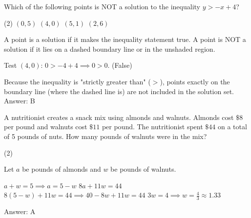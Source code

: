 \documentclass[11pt,paper=a4,answers]{exam}
\begin{document}
\begin{questions}
\question
\begin{center}
\end{center}
Which of the following points is NOT a solution to the inequality $y > -x + 4$?
\begin{tasks}(2)
\task $(0, 5)$
\task $(4, 0)$
\task $(5, 1)$
\task $(2, 6)$
\end{tasks}

\begin{solution}
A point is a solution if it makes the inequality statement true. A point is NOT a solution if it lies on a dashed boundary line or in the unshaded region.
\vspace{5pt}
\begin{center}
Test $(4, 0)$: $0 > -4 + 4 \implies 0 > 0$. (False)
\end{center}
\vspace{5pt}
Because the inequality is "strictly greater than" ($>$), points exactly on the boundary line (where the dashed line is) are not included in the solution set.
\vspace{5pt}
Answer: \colorbox{yellow!100}{B}
\end{solution}

\vspace{1cm}

\question
A nutritionist creates a snack mix using almonds and walnuts. Almonds cost $\$8$ per pound and walnuts cost $\$11$ per pound. The nutritionist spent $\$44$ on a total of 5 pounds of nuts. How many pounds of walnuts were in the mix?
\begin{tasks}(2)
   
\end{tasks}

\begin{solution}
Let $a$ be pounds of almonds and $w$ be pounds of walnuts.
\vspace{5pt}
\begin{center}
$a + w = 5 \implies a = 5 - w$
\vspace{5pt}
$8a + 11w = 44$
\vspace{5pt}
$8(5 - w) + 11w = 44 \implies 40 - 8w + 11w = 44$
\vspace{5pt}
$3w = 4 \implies w = \frac{4}{3} \approx 1.33$
\end{center}
\vspace{5pt}
Answer: \colorbox{yellow!100}{A}
\end{solution}


\end{questions}
\end{document}
